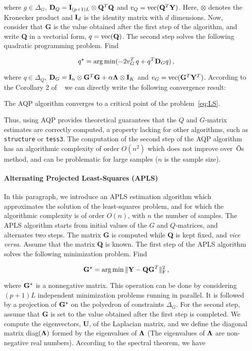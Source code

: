 \noindent where $g \in \Delta_G$, ${\bf D}_Q = {\bf I}_{(p+1)L} \otimes {\bf Q}^T {\bf Q}$ and $v_Q = {\rm vec}({\bf Q}^T {\bf Y})$. Here, $\otimes$ denotes the Kronecker product and ${\bf I}_d$ is the identity matrix with $d$ dimensions.  Now, consider that {\bf G} is the value obtained after the first step of the algorithm, and write {\bf Q} in a vectorial form, $q = {\rm vec({\bf Q})}$. The second step solves the following quadratic programming problem. Find

$$  
q^\star = \arg \min ( -2 v^T_G \, q + q^T {\bf D}_G q ) \,  ,
$$


\noindent where  $q \in \Delta_Q$, ${\bf D}_G = {\bf I}_{n} \otimes {\bf G}^T {\bf G } + \alpha {\bf \Lambda}  \otimes {\bf I}_K$ and $v_G = {\rm vec}({\bf G}^T{\bf  Y}^T)$. According to the Corollary 2 of ~\cite{Grippo2000} we can directly write the following convergence result:
\begin{thm}
	The AQP algorithm converges to a critical point of the problem~\ref{eq:LS}.
\end{thm}
Thus, using AQP provides theoretical guarantees that the $Q$ and $G$-matrix estimates are correctly computed, a property lacking for other algorithms, such as {\tt structure} or {\tt tess3}.  The computation of the second step of the AQP algorithm has an algorithmic complexity of order $O(n^2)$ which does not improve over~\cite{Caye2016}Õs method, and can be problematic for large samples ($n$ is the sample size). 


\paragraph{Alternating Projected Least-Squares (APLS)} In this paragraph, we introduce an APLS estimation algorithm which approximates the solution of the least-squares problem, and for which the algorithmic complexity is of order $O(n)$, with $n$ the number of samples. The APLS algorithm starts from initial values of the $G$ and $Q$-matrices, and alternates two steps. The matrix {\bf G} is computed  while  {\bf Q} is kept fixed, and {\it vice versa}. Assume that the matrix {\bf Q} is known. The first step of the APLS algorithm solves the following minimization problem. Find 

$$
{\bf G}^\star = \arg \min  \|  {\bf Y} - {\bf QG}^T \|^2_{\rm F} \, ,
$$

\noindent where ${\bf G}^\star$ is a nonnegative matrix. This operation can be done by considering $(p+1)L$ independent minimization problems running in parallel. It is followed by a projection of ${\bf G}^\star$ on the polyedron of constraints $\Delta_G$. For the second step, assume that {\bf G} is set to the value obtained after the first step is completed. We compute the eigenvectors, {\bf U}, of the Laplacian matrix, and we define the diagonal matrix diag$({\bf \Lambda})$ formed by the eigenvalues of ${\bf \Lambda}$ (The eigenvalues of ${\bf \Lambda}$ are non-negative real numbers). According to the spectral theorem, we have

